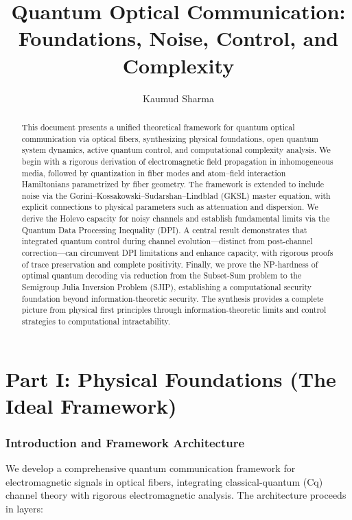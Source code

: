 \documentclass[12pt]{article}
\title{Quantum Optical Communication: \\ Foundations, Noise, Control, and Complexity}
\author{Kaumud Sharma}
\date{}
\begin{document}
\maketitle
\begin{abstract}
This document presents a unified theoretical framework for quantum optical communication via optical fibers, synthesizing physical foundations, open quantum system dynamics, active quantum control, and computational complexity analysis. We begin with a rigorous derivation of electromagnetic field propagation in inhomogeneous media, followed by quantization in fiber modes and atom--field interaction Hamiltonians parametrized by fiber geometry. The framework is extended to include noise via the Gorini--Kossakowski--Sudarshan--Lindblad (GKSL) master equation, with explicit connections to physical parameters such as attenuation and dispersion. We derive the Holevo capacity for noisy channels and establish fundamental limits via the Quantum Data Processing Inequality (DPI). A central result demonstrates that integrated quantum control during channel evolution---distinct from post-channel correction---can circumvent DPI limitations and enhance capacity, with rigorous proofs of trace preservation and complete positivity. Finally, we prove the NP-hardness of optimal quantum decoding via reduction from the Subset-Sum problem to the Semigroup Julia Inversion Problem (SJIP), establishing a computational security foundation beyond information-theoretic security. The synthesis provides a complete picture from physical first principles through information-theoretic limits and control strategies to computational intractability.
\end{abstract}

\newpage
\tableofcontents
\newpage

\part*{Part I: Physical Foundations (The Ideal Framework)}

\section{Introduction and Framework Architecture}
We develop a comprehensive quantum communication framework for electromagnetic signals in optical fibers, integrating classical-quantum (Cq) channel theory with rigorous electromagnetic analysis. The architecture proceeds in layers:
\end{document}
